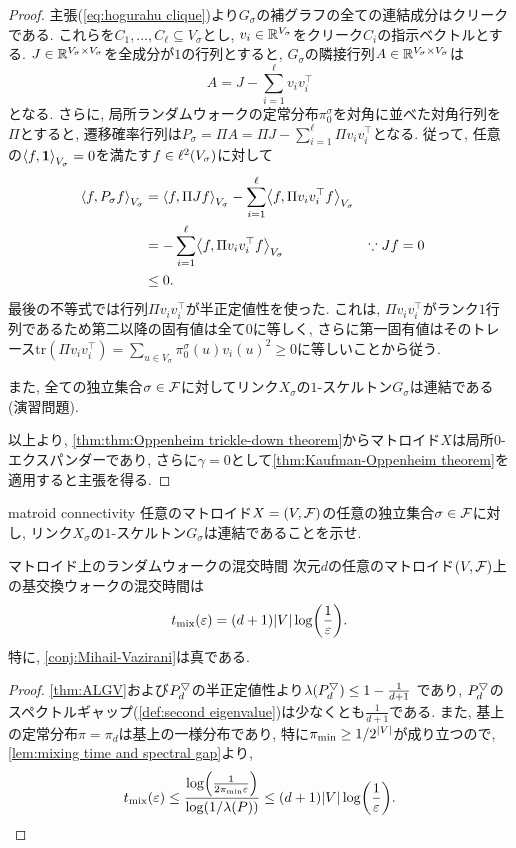 \begin{proof}
    主張(\ref{eq:hogurahu clique})より$G_\sigma$の補グラフの全ての連結成分はクリークである.
    これらを$C_1,\dots,C_\ell \subseteq V_\sigma$とし,
    $v_i\in \Real^{V_\sigma}$をクリーク$C_i$の指示ベクトルとする.
    $J\in\Real^{V_\sigma\times V_\sigma}$を全成分が$1$の行列とすると,
    $G_\sigma$の隣接行列$A\in\Real^{V_\sigma\times V_\sigma}$は
    \[
        A = J - \sum_{i=1}^\ell v_i v_i^\top
    \]
    となる.
    さらに, 局所ランダムウォークの定常分布$\pi^\sigma_0$を対角に並べた対角行列を$\Pi$とすると, 遷移確率行列は$P_\sigma = \Pi A = \Pi J - \sum_{i=1}^\ell \Pi v_iv_i^\top$となる.
    従って, 任意の$\iprod[V_\sigma]{f,\allone}=0$を満たす$f\in \ispace[V_\sigma]$に対して
    \begin{align*}
        \iprod[V_\sigma]{f,P_\sigma f} &= \iprod[V_\sigma]{f,\Pi J f} - \sum_{i=1}^\ell \iprod[V_\sigma]{f,\Pi v_iv_i^\top f} \\
        &= - \sum_{i=1}^\ell \iprod[V_\sigma]{f,\Pi v_iv_i^\top f} & & \text{$\because J f = 0$} \\
        &\le 0.
    \end{align*}
    最後の不等式では行列$\Pi v_iv_i^\top$が半正定値性を使った.
    これは,
    $\Pi v_i v_i^\top$がランク$1$行列であるため第二以降の固有値は全て$0$に等しく,
    さらに第一固有値はそのトレース$\mathrm{tr}(\Pi v_i v_i^\top) = \sum_{u\in V_\sigma} \pi^\sigma_0(u) v_i(u)^2\ge 0$に等しいことから従う.
    
    また, 全ての独立集合$\sigma\in \F$に対してリンク$X_\sigma$の$1$-スケルトン$G_\sigma$は連結である (演習問題).

    以上より, \cref{thm:thm:Oppenheim trickle-down theorem}からマトロイド$X$は局所$0$-エクスパンダーであり, さらに$\gamma=0$として\cref{thm:Kaufman-Oppenheim theorem}を適用すると主張を得る.
\end{proof}

\begin{exercise}{}{matroid connectivity}
    任意のマトロイド$X = (V,\F)$の任意の独立集合$\sigma \in \F$に対し,
    リンク$X_\sigma$の$1$-スケルトン$G_\sigma$は連結であることを示せ.
\end{exercise}

\begin{corollary}{マトロイド上のランダムウォークの混交時間}{}
    次元$d$の任意のマトロイド$(V,\F)$上の基交換ウォークの混交時間は
    \[
        \tmix(\varepsilon) = (d+1)|V|\log\rbra*{\frac{1}{\varepsilon}}.
    \]
    特に, \cref{conj:Mihail-Vazirani}は真である.
\end{corollary}
\begin{proof}
    \cref{thm:ALGV}および$\PDU_d$の半正定値性より$\lambda(\PDU_d) \le 1-\frac{1}{d+1}$ であり, $\PDU_d$のスペクトルギャップ(\cref{def:second eigenvalue})は少なくとも$\frac{1}{d+1}$である.
    また, 基上の定常分布$\pi=\pi_d$は基上の一様分布であり, 特に$\pimin \ge 1/2^{|V|}$が成り立つので, \cref{lem:mixing time and spectral gap}より, 
    \[
        \tmix(\varepsilon) \le \frac{\log\rbra*{\frac{1}{2\pimin\varepsilon}}}{\log(1/\lambda(P))} \le (d+1)|V|\log\rbra*{\frac{1}{\varepsilon}}.
    \]
\end{proof}